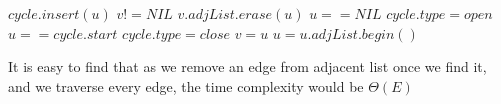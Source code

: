 \documentclass[]{article}
\begin{document}
\begin{codebox}
	
	\li $cycle.insert(u)$
	\li \If $v != NIL$ 
	\li \Then $v.adjList.erase(u)$ \End
	\li \If $u == NIL$ 
	\li \Then $cycle.type = open$
	\li \Return  
	\li \ElseIf $u == cycle.start$ 
	\li \Then $cycle.type = close$
	\li \Return 
	\li \Else $v = u$
	\li $u = u.adjList.begin()$
	\li {}
	\End
	\End
	
\end{codebox}

It is easy to find that as we remove an edge from adjacent list once we find it, and we traverse every edge, the time complexity would be $\Theta(E)$
\end{document}

